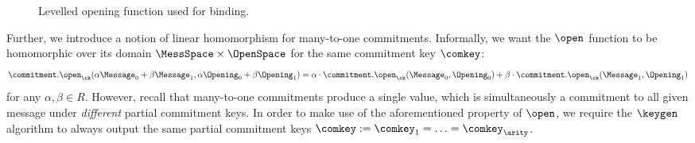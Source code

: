 	\begin{figure}[t]
		\centering
		\caption{Levelled opening function used for binding.}\label{fig:levelopen}
	\end{figure}
    \noindent Further, we introduce a notion of linear homomorphism for many-to-one commitments. Informally, we want the $\open$ function to be homomorphic over its domain $\MessSpace \times \OpenSpace$ for the same commitment key $\comkey$:
    \[ \commitment.\open_{\ck}(\alpha\Message_0 + \beta\Message_1,  \alpha\Opening_0+\beta \Opening_1 ) = \alpha \cdot \commitment.\open_{\ck}(\Message_0, \Opening_0) +  \beta \cdot \commitment.\open_{\ck}(\Message_1, \Opening_1)\]
    for any $\alpha,\beta \in R$. However, recall that many-to-one commitments produce a single value, which is simultaneously a commitment to all given message under \textit{different} partial commitment keys. In order to make use of the aforementioned property of $\open$, we require the $\keygen$ algorithm to always output the same partial commitment keys $\comkey := \comkey_1=\ldots=\comkey_\arity$. 
